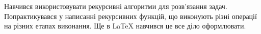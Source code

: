 \begin{minipage}[t]{0.45\linewidth}
\end{minipage}
\hfill
\begin{minipage}[t]{0.45\linewidth}
\end{minipage}

\par
\vspace{3em}

\begin{minipage}[t]{0.45\linewidth}
\end{minipage}
\hfill
\begin{minipage}[t]{0.45\linewidth}
\end{minipage}

\conclusion%
Навчився використовувати рекурсивні алгоритми для розв'язання задач.
Попрактикувався у написанні рекурсивних функцій, що виконують різні операції на різних етапах виконання.
Ще в \LaTeX{} навчився це все діло оформлювати.



